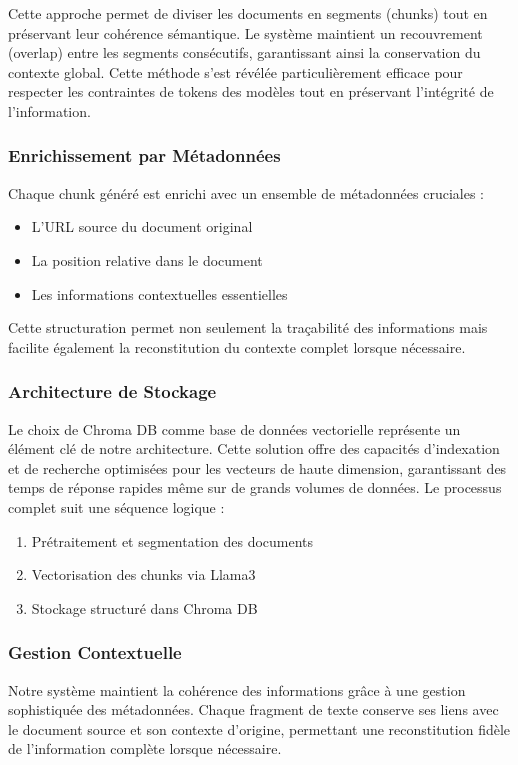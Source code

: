 \documentclass{article}
\begin{document}
Cette approche permet de diviser les documents en segments (chunks) tout en préservant leur cohérence sémantique. Le système maintient un recouvrement (overlap) entre les segments consécutifs, garantissant ainsi la conservation du contexte global. Cette méthode s'est révélée particulièrement efficace pour respecter les contraintes de tokens des modèles tout en préservant l'intégrité de l'information.

\subsubsection{Enrichissement par Métadonnées}
Chaque chunk généré est enrichi avec un ensemble de métadonnées cruciales :
\begin{itemize}
    \item L'URL source du document original
    \item La position relative dans le document
    \item Les informations contextuelles essentielles
\end{itemize}
Cette structuration permet non seulement la traçabilité des informations mais facilite également la reconstitution du contexte complet lorsque nécessaire.

\subsubsection{Architecture de Stockage}
Le choix de Chroma DB comme base de données vectorielle représente un élément clé de notre architecture. Cette solution offre des capacités d'indexation et de recherche optimisées pour les vecteurs de haute dimension, garantissant des temps de réponse rapides même sur de grands volumes de données. Le processus complet suit une séquence logique :
\begin{enumerate}
    \item Prétraitement et segmentation des documents
    \item Vectorisation des chunks via Llama3
    \item Stockage structuré dans Chroma DB
\end{enumerate}

\subsubsection{Gestion Contextuelle}
Notre système maintient la cohérence des informations grâce à une gestion sophistiquée des métadonnées. Chaque fragment de texte conserve ses liens avec le document source et son contexte d'origine, permettant une reconstitution fidèle de l'information complète lorsque nécessaire.
\end{document}
